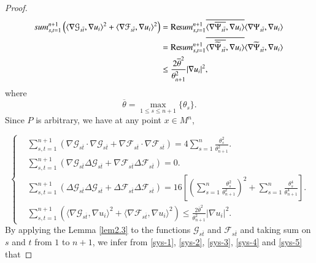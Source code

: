 \documentclass[12pt]{article}
\numberwithin{equation}{section}
\begin{document}
\begin{proof}
\begin{equation}\begin{aligned}\label{sys-4}\sum^{n+1}_{s,t=1}\left(\langle\nabla \mathcal{G}_{s\overline{t}},\nabla u_{i}\rangle^{2}
+\langle\nabla \mathcal{F}_{s\overline{t}},\nabla u_{i}\rangle^{2}\right)
&={\rm Re}\sum^{n+1}_{s,t=1}\overline{\langle\nabla\overline{\Psi_{s\overline{t}}},\nabla u_{i}\rangle}\langle\nabla \Psi_{s\overline{t}},\nabla u_{i}\rangle\\
&={\rm Re}\sum^{n+1}_{s,t=1}\overline{\langle\nabla\overline{\widetilde{\Psi}_{s\overline{t}}},
\nabla u_{i}\rangle}\langle\nabla \widetilde{\Psi}_{s\overline{t}},\nabla u_{i}\rangle\\
&\leq\frac{2\overline{\theta}^{2}}{\theta^{2}_{n+1}}|\nabla u_{i}|^{2},
\end{aligned}\end{equation}where$$\overline{\theta}
=\max_{1\leq s\leq n+1}\{\theta_{s}\}.$$Since $P$ is arbitrary, we have at any point $x \in M^{n}$,



\begin{equation}\left\{\begin{aligned}\label{sys-5}&\sum^{n+1}_{s,t=1}\left(\nabla \mathcal{G}_{s\overline{t}}\cdot\nabla \mathcal{G}_{s\overline{t}}
+\nabla \mathcal{F}_{s\overline{t}}\cdot\nabla \mathcal{F}_{s\overline{t}}\right)=4\sum^{n}_{s=1}\frac{\theta_{s}^{2}}{\theta_{n+1}^{2}}.
\\&\sum^{n+1}_{s,t=1}\left(\nabla \mathcal{G}_{s\overline{t}}\Delta \mathcal{G}_{s\overline{t}}+\nabla \mathcal{F}_{s\overline{t}}\Delta \mathcal{F}_{s\overline{t}}\right)=0.
\\&\sum^{n+1}_{s,t=1}\left(\Delta \mathcal{G}_{s\overline{t}}\Delta \mathcal{G}_{s\overline{t}}+\Delta \mathcal{F}_{s\overline{t}}\Delta \mathcal{F}_{s\overline{t}}\right)=
16\left[\left(\sum^{n}_{s=1}\frac{\theta_{s}^{2}}{\theta_{n+1}^{2}} \right)^{2}+\sum^{n}_{s=1}\frac{\theta_{s}^{4}}{\theta_{n+1}^{4}}\right].
\\&\sum^{n+1}_{s,t=1}\left(\langle\nabla \mathcal{G}_{s\overline{t}},\nabla u_{i}\rangle^{2}
+\langle\nabla \mathcal{F}_{s\overline{t}},\nabla u_{i}\rangle^{2}\right)\leq\frac{2\overline{\theta}^{2}}{\theta^{2}_{n+1}}|\nabla u_{i}|^{2}.
\end{aligned}\right.\end{equation}
By applying the Lemma \ref{lem2.3} to the functions $\mathcal{G}_{s\overline{t}}$ and $\mathcal{F}_{s\overline{t}}$ and taking sum on $s$ and $t$
from $1$ to $n+1$, we infer from \eqref{sys-1}, \eqref{sys-2}, \eqref{sys-3}, \eqref{sys-4} and \eqref{sys-5} that


\end{proof}
\end{document}
